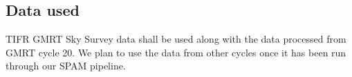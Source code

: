 \documentclass{article}
\begin{document}
\begin{multicols*}{2}
\section{Data used}
    TIFR GMRT Sky Survey data shall be used along with the data processed from GMRT cycle 20. We plan to use the data from other cycles once it has been run through our SPAM pipeline. 

\end{multicols*}
\end{document}
